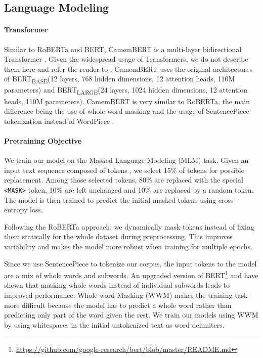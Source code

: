 \documentclass[11pt,a4paper]{article}
\newcommand{\camembert}{CamemBERT\xspace}
\newcommand{\roberta}{RoBERTa\xspace}
\newcommand{\bert}{BERT\xspace}
\newcommand{\bertbase}{BERT\textsubscript{BASE}\xspace}
\newcommand{\bertlarge}{BERT\textsubscript{LARGE}\xspace}
\begin{document}
\subsection{Language Modeling}

\paragraph{Transformer}
Similar to \roberta and \bert, \camembert is a multi-layer bidirectional Transformer \cite{vaswani2017attention}. Given the widespread usage of Transformers, we do not describe them here and refer the reader to \citep{vaswani2017attention}.
\camembert uses the original architectures of \bertbase (12 layers, 768 hidden dimensions, 12 attention heads, 110M parameters) and \bertlarge (24 layers, 1024 hidden dimensions, 12 attention heads, 110M parameters).
\camembert is very similar to \roberta, the main difference being the use of whole-word masking and the usage of SentencePiece tokenization \cite{kudo2018sentencepiece} instead of WordPiece \cite{schuster2012japanese}.

\paragraph{Pretraining Objective}
We train our model on the Masked Language Modeling (MLM) task.
Given an input text sequence composed of  tokens , we select 15\% of tokens for possible replacement. Among those selected tokens, 80\% are replaced with the special \texttt{<MASK>} token, 10\% are left unchanged and 10\% are replaced by a random token. The model is then trained to predict the initial masked tokens using cross-entropy loss.

Following the \roberta approach, we dynamically mask tokens instead of fixing them statically for the whole dataset during preprocessing. This improves variability and makes the model more robust when training for multiple epochs.

Since we use SentencePiece to tokenize our corpus, the input tokens to the model are a mix of whole words and subwords.
An upgraded version of \bert\footnote{\url{https://github.com/google-research/bert/blob/master/README.md}} and \citet{joshi2019spanbert} have shown that masking whole words instead of individual subwords leads to improved performance.
Whole-word Masking (WWM) makes the training task more difficult because the model has to predict a whole word rather than predicting only part of the word given the rest.
We train our models using WWM by using whitespaces in the initial untokenized text as word delimiters.
\end{document}
